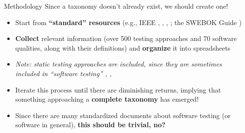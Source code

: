 \documentclass[22pt]{beamer}
\begin{document}
\begin{frame}[fragile]
\begin{textblock}{7.25}
        \begin{block}{\fontsize{37}{20}\selectfont Methodology}
            Since a taxonomy doesn't already exist, we should create one!
            \begin{itemize}
                \item Start from \textbf{``standard'' resources}
                      (e.g., IEEE \cite{IEEE2022}, \cite{IEEE2021},
                      \cite{IEEE2017}, \cite{IEEE2013};
                      the SWEBOK Guide \cite{SWEBOK2024})
                \item \textbf{Collect} relevant information (over 500 testing
                      approaches and 70 software qualities, along with their
                      definitions) and \textbf{organize} it into spreadsheets
                \item \emph{Note: static testing approaches are included, since
                          they are sometimes included in ``software testing''
                          \cite[p.~17]{IEEE2022}, \cite[p.~440]{IEEE2017},
                          \cite[p.~5-2]{SWEBOK2024}}
                \item Iterate this process until there are
                      diminishing returns, implying that something approaching
                      a \textbf{complete taxonomy} has emerged!
                \item Since there are many standardized documents about
                      software testing (or software in general),
                      \textbf{this should be trivial, no?}
            \end{itemize}
            \vspace{5mm}
        \end{block}


\end{textblock}
\end{frame}
\end{document}
